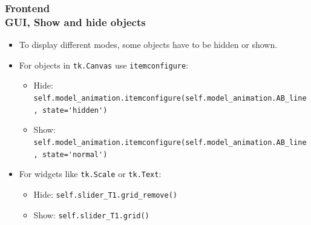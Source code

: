 \documentclass[ucs,10pt]{beamer}
\begin{document}

\begin{frame}[fragile]
\frametitle{Frontend \\
	\small \color{rwth-blue} GUI, Show and hide objects}
	\begin{itemize}
		\item To display different modes, some objects have to be hidden or shown.
		\item For objects in \lstinline|tk.Canvas| use \lstinline|itemconfigure|:
		\begin{itemize}
			\item Hide: \lstinline|self.model_animation.itemconfigure(self.model_animation.AB_line, state='hidden')|
			\item Show: \lstinline|self.model_animation.itemconfigure(self.model_animation.AB_line, state='normal')|
		\end{itemize}
		\item For widgets like \lstinline|tk.Scale| or \lstinline|tk.Text|:
		\begin{itemize}
			\item Hide: \lstinline|self.slider_T1.grid_remove()|
			\item Show: \lstinline|self.slider_T1.grid()|
		\end{itemize}
	\end{itemize}
\end{frame}
\end{document}
